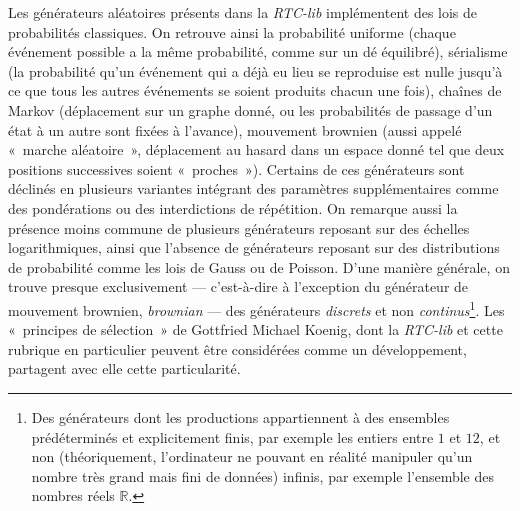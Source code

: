 \documentclass[a4paper,12pt]{article}
\newcommand{\guill}[1]{«~#1~»}
\begin{document}
Les générateurs aléatoires présents dans la \emph{RTC-lib} implémentent des lois de probabilités classiques. On retrouve ainsi la probabilité uniforme (chaque événement possible a la même probabilité, comme sur un dé équilibré), sérialisme (la probabilité qu'un événement qui a déjà eu lieu se reproduise est nulle jusqu'à ce que tous les autres événements se soient produits chacun une fois), chaînes de Markov (déplacement sur un graphe donné, ou les probabilités de passage d'un état à un autre sont fixées à l'avance), mouvement brownien (aussi appelé \guill{marche aléatoire}, déplacement au hasard dans un espace donné tel que deux positions successives soient \guill{proches}). Certains de ces générateurs sont déclinés en plusieurs variantes intégrant des paramètres supplémentaires comme des pondérations ou des interdictions de répétition. On remarque aussi la présence moins commune de plusieurs générateurs reposant sur des échelles logarithmiques, ainsi que l'absence de générateurs reposant sur des distributions de probabilité comme les lois de Gauss ou de Poisson. D'une manière générale, on trouve presque exclusivement --- c'est-à-dire à l'exception du générateur de mouvement brownien, \emph{brownian} --- des générateurs \emph{discrets} et non \emph{continus}\footnote{Des générateurs dont les productions appartiennent à des ensembles prédéterminés et explicitement finis, par exemple les entiers entre $1$ et $12$, et non (théoriquement, l'ordinateur ne pouvant en réalité manipuler qu'un nombre très grand mais fini de données) infinis, par exemple l'ensemble des nombres réels $\mathbb{R}$.}. Les \guill{principes de sélection} de Gottfried Michael Koenig, dont la \emph{RTC-lib} et cette rubrique en particulier peuvent être considérées comme un développement, partagent avec elle cette particularité.
\end{document}
